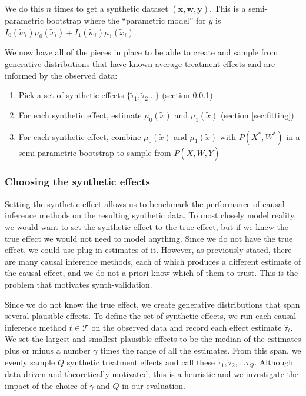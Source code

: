 We do this $n$ times to get a synthetic dataset $(\tilde{\mathbf{x}}, \tilde{\mathbf{w}}, \tilde{\mathbf{y}})$. This is a semi-parametric bootstrap where the ``parametric model'' for $\tilde y$ is $I_0(\tilde w_i)\mu_0(\tilde x_i) + I_1(\tilde w_i)\mu_1(\tilde x_i)$.

We now have all of the pieces in place to be able to create and sample from generative distributions that have known average treatment effects and are informed by the observed data:

\begin{enumerate}
\item Pick a set of synthetic effects $\{\tilde \tau_1, \tilde \tau_2 \dots\}$ (section \ref{sec:synth-effect})
\item For each synthetic effect, estimate $\mu_0(\tilde x)$ and $\mu_1(\tilde x)$ (section \ref{sec:fitting})
\item For each synthetic effect, combine $\mu_0(\tilde x)$ and $\mu_1(\tilde x)$ with $P(X^*, W^*)$ in a semi-parametric bootstrap to sample from $P(\tilde X, \tilde W, \tilde Y)$
\end{enumerate}


\subsubsection{Choosing the synthetic effects}
\label{sec:synth-effect}

Setting the synthetic effect allows us to benchmark the performance of causal inference methods on the resulting synthetic data. To most closely model reality, we would want to set the synthetic effect to the true effect, but if we knew the true effect we would not need to model anything. Since we do not have the true effect, we could use plug-in estimates of it. However, as previously stated, there are many causal inference methods, each of which produces a different estimate of the causal effect, and we do not a-priori know which of them to trust. This is the problem that motivates synth-validation. 

Since we do not know the true effect, we create generative distributions that span several plausible effects. To define the set of synthetic effects, we run each causal inference method $t \in \mathcal{T}$ on the observed data and record each effect estimate $\hat\tau_t$. We set the largest and smallest plausible effects to be the median of the estimates plus or minus a number $\gamma$ times the range of all the estimates. From this span, we evenly sample $Q$ synthetic treatment effects and call these $\tilde\tau_1, \tilde\tau_2, \dots \tilde\tau_Q$. Although data-driven and theoretically motivated, this is a heuristic and we investigate the impact of the choice of $\gamma$ and $Q$ in our evaluation. 


